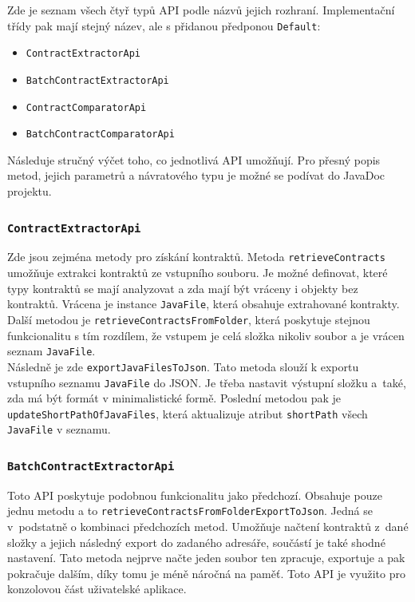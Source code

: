 	    	Zde je seznam všech čtyř typů API podle názvů jejich rozhraní. Implementační třídy pak mají stejný název, ale s přidanou předponou \texttt{Default}:
				
				\begin{itemize}
					\item \texttt{ContractExtractorApi}
					\item \texttt{BatchContractExtractorApi}
					\item \texttt{ContractComparatorApi}
					\item \texttt{BatchContractComparatorApi}
				\end{itemize}					    	
	    	
	    	Následuje stručný výčet toho, co jednotlivá API umožňují. Pro přesný popis metod, jejich parametrů a návratového typu je možné se podívat do JavaDoc projektu.
	    
			\subsubsection{\texttt{ContractExtractorApi}}
					Zde jsou zejména metody pro získání kontraktů. Metoda \texttt{retrieveContracts} umožňuje extrakci kontraktů ze vstupního souboru. Je možné definovat, které typy kontraktů se mají analyzovat a zda mají být vráceny i objekty bez kontraktů. Vrácena je instance \texttt{JavaFile}, která obsahuje extrahované kontrakty. Další metodou je \texttt{retrieveContractsFromFolder}, která poskytuje stejnou funkcionalitu s tím rozdílem, že vstupem je celá složka nikoliv soubor a je vrácen seznam \texttt{JavaFile}.\\
					
					Následně je zde \texttt{exportJavaFilesToJson}. Tato metoda slouží k exportu vstupního seznamu \texttt{JavaFile} do JSON. Je třeba nastavit výstupní složku a~také, zda má být formát v minimalistické formě. Poslední metodou pak je \texttt{updateShortPathOfJavaFiles}, která aktualizuje atribut \texttt{shortPath} všech \texttt{JavaFile} v seznamu.	    
			    
			\subsubsection{\texttt{BatchContractExtractorApi}}	
				Toto API poskytuje podobnou funkcionalitu jako předchozí. Obsahuje pouze jednu metodu a to \texttt{retrieveContractsFromFolderExportToJson}. Jedná se v~podstatně o kombinaci předchozích metod. Umožňuje načtení kontraktů z~dané složky a jejich následný export do zadaného adresáře, součástí je také shodné nastavení. Tato metoda nejprve načte jeden soubor ten zpracuje, exportuje a pak pokračuje dalším, díky tomu je méně náročná na paměť. Toto API je využito pro konzolovou část uživatelské aplikace.
				
